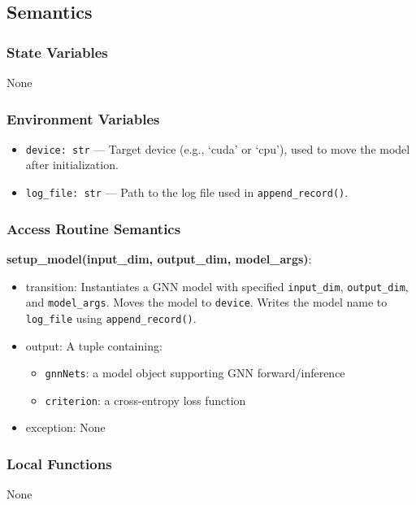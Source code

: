 \documentclass[12pt, titlepage]{article}
\begin{document}
\subsection{Semantics}

\subsubsection{State Variables}
None

\subsubsection{Environment Variables}
\begin{itemize}
  \item \texttt{device: str} — Target device (e.g., `cuda' or `cpu'), used to move the model after initialization.
  \item \texttt{log\_file: str} — Path to the log file used in \texttt{append\_record()}.
\end{itemize}

\subsubsection{Access Routine Semantics}

\noindent \textbf{setup\_model(input\_dim, output\_dim, model\_args)}:
\begin{itemize}
  \item transition: Instantiates a GNN model with specified \texttt{input\_dim}, \texttt{output\_dim}, and \texttt{model\_args}. Moves the model to \texttt{device}. Writes the model name to \texttt{log\_file} using \texttt{append\_record()}.
  \item output: A tuple containing:
  \begin{itemize}
    \item \texttt{gnnNets}: a model object supporting GNN forward/inference
    \item \texttt{criterion}: a cross-entropy loss function
  \end{itemize}
  \item exception: None
\end{itemize}

\subsubsection{Local Functions}
None
\end{document}
